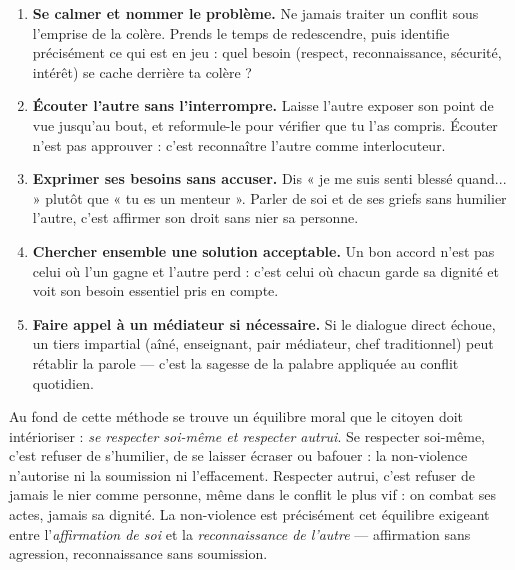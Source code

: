 \documentclass[11pt]{article}
\begin{document}
\begin{methode}
\begin{enumerate}
\item \textbf{Se calmer et nommer le problème.} Ne jamais traiter un conflit sous l'emprise de la colère. Prends le temps de redescendre, puis identifie précisément ce qui est en jeu : quel besoin (respect, reconnaissance, sécurité, intérêt) se cache derrière ta colère ?
\item \textbf{Écouter l'autre sans l'interrompre.} Laisse l'autre exposer son point de vue jusqu'au bout, et reformule-le pour vérifier que tu l'as compris. Écouter n'est pas approuver : c'est reconnaître l'autre comme interlocuteur.
\item \textbf{Exprimer ses besoins sans accuser.} Dis « je me suis senti blessé quand... » plutôt que « tu es un menteur ». Parler de soi et de ses griefs sans humilier l'autre, c'est affirmer son droit sans nier sa personne.
\item \textbf{Chercher ensemble une solution acceptable.} Un bon accord n'est pas celui où l'un gagne et l'autre perd : c'est celui où chacun garde sa dignité et voit son besoin essentiel pris en compte.
\item \textbf{Faire appel à un médiateur si nécessaire.} Si le dialogue direct échoue, un tiers impartial (aîné, enseignant, pair médiateur, chef traditionnel) peut rétablir la parole — c'est la sagesse de la palabre appliquée au conflit quotidien.
\end{enumerate}
\end{methode}

Au fond de cette méthode se trouve un équilibre moral que le citoyen doit intérioriser : \emph{se respecter soi-même et respecter autrui}. Se respecter soi-même, c'est refuser de s'humilier, de se laisser écraser ou bafouer : la non-violence n'autorise ni la soumission ni l'effacement. Respecter autrui, c'est refuser de jamais le nier comme personne, même dans le conflit le plus vif : on combat ses actes, jamais sa dignité. La non-violence est précisément cet équilibre exigeant entre l'\emph{affirmation de soi} et la \emph{reconnaissance de l'autre} — affirmation sans agression, reconnaissance sans soumission.
\end{document}
